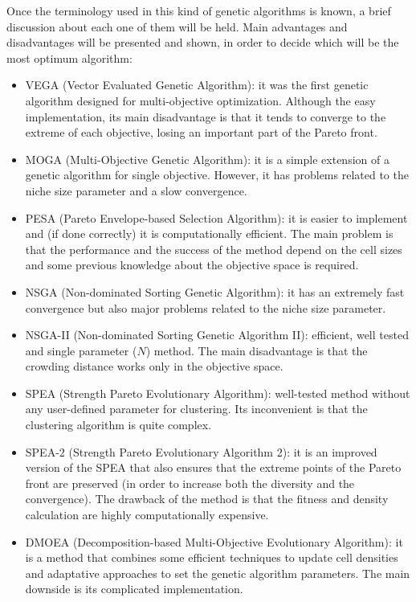     Once the terminology used in this kind of genetic algorithms is known, a brief discussion about each one of them will be held. Main advantages and disadvantages will be presented and shown, in order to decide which will be the most optimum algorithm:

    \newpage

    \begin{itemize}
        \item VEGA (Vector Evaluated Genetic Algorithm): it was the first genetic algorithm designed for multi-objective optimization. Although the easy implementation, its main disadvantage is that it tends to converge to the extreme of each objective, losing an important part of the Pareto front.
        \item MOGA (Multi-Objective Genetic Algorithm): it is a simple extension of a genetic algorithm for single objective. However, it has problems related to the niche size parameter and a slow convergence.
        \item PESA (Pareto Envelope-based Selection Algorithm): it is easier to implement and (if done correctly) it is computationally efficient. The main problem is that the performance and the success of the method depend on the cell sizes and some previous knowledge about the objective space is required.
        \item NSGA (Non-dominated Sorting Genetic Algorithm): it has an extremely fast convergence but also major problems related to the niche size parameter.
        \item NSGA-II (Non-dominated Sorting Genetic Algorithm II): efficient, well tested and single parameter ($N$) method. The main disadvantage is that the crowding distance works only in the objective space.
        \item SPEA (Strength Pareto Evolutionary Algorithm): well-tested method without any user-defined parameter for clustering. Its inconvenient is that the clustering algorithm is quite complex.
        \item SPEA-2 (Strength Pareto Evolutionary Algorithm 2): it is an improved version of the SPEA that also ensures that the extreme points of the Pareto front are preserved (in order to increase both the diversity and the convergence). The drawback of the method is that the fitness and density calculation are highly computationally expensive.
        \item DMOEA (Decomposition-based Multi-Objective Evolutionary Algorithm): it is a method that combines some efficient techniques to update cell densities and adaptative approaches to set the genetic algorithm parameters. The main downside is its complicated implementation.
    \end{itemize}
    
